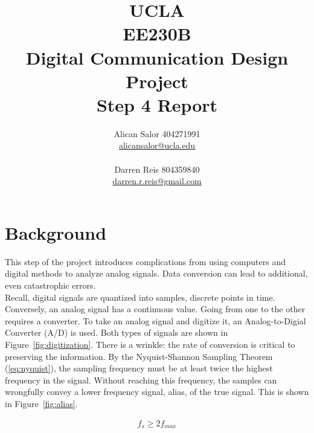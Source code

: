 \documentclass[]{article}
\title{UCLA\\EE230B\\Digital Communication Design Project\\Step 4 Report}
\author{Alican Salor 404271991 \\  \href{mailto:alicansalor@ucla.edu}{alicansalor@ucla.edu} \\ \\
Darren Reis 804359840 \\
\href{mailto:darrer.r.reis@gmail.com}{darren.r.reis@gmail.com} }
\begin{document}
\maketitle

\newpage
\tableofcontents

\newpage

\section{Background}
\label{sec:background}
This step of the project introduces complications from using computers and digital methods to analyze analog signals.  Data conversion can lead to additional, even catastrophic errors.\\
Recall, digital signals are quantized into samples, discrete points in time.  Conversely, an analog signal has a continuous value.  Going from one to the other requires a converter.  To take an analog signal and digitize it, an Analog-to-Digial Converter (A/D) is used.  Both types of signals are shown in Figure~\ref{fig:digitization}.  There is a wrinkle: the rate of conversion is critical to preserving the information.  By the Nyquist-Shannon Sampling Theorem (\ref{eq:nyquist}), the sampling frequency must be at least twice the highest frequency in the signal.  Without 
reaching this frequency, the samples can wrongfully convey a lower frequency signal, alias, of the true signal.  This is shown in Figure~\ref{fig:alias}.  

\begin{align}
\label{eq:nyquist}
f_s \geq 2 f_{max}
\end{align}
\end{document}
